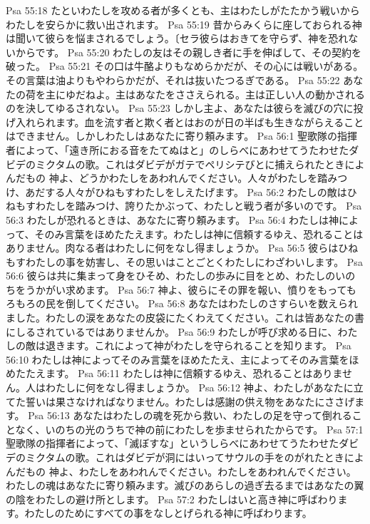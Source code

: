 Psa 55:18  たといわたしを攻める者が多くとも、主はわたしがたたかう戦いからわたしを安らかに救い出されます。
Psa 55:19  昔からみくらに座しておられる神は聞いて彼らを悩まされるでしょう。〔セラ彼らはおきてを守らず、神を恐れないからです。
Psa 55:20  わたしの友はその親しき者に手を伸ばして、その契約を破った。
Psa 55:21  その口は牛酪よりもなめらかだが、その心には戦いがある。その言葉は油よりもやわらかだが、それは抜いたつるぎである。
Psa 55:22  あなたの荷を主にゆだねよ。主はあなたをささえられる。主は正しい人の動かされるのを決してゆるされない。
Psa 55:23  しかし主よ、あなたは彼らを滅びの穴に投げ入れられます。血を流す者と欺く者とはおのが日の半ばも生きながらえることはできません。しかしわたしはあなたに寄り頼みます。
Psa 56:1  聖歌隊の指揮者によって、「遠き所におる音をたてぬはと」のしらべにあわせてうたわせたダビデのミクタムの歌。これはダビデがガテでペリシテびとに捕えられたときによんだもの 神よ、どうかわたしをあわれんでください。人々がわたしを踏みつけ、あだする人々がひねもすわたしをしえたげます。
Psa 56:2  わたしの敵はひねもすわたしを踏みつけ、誇りたかぶって、わたしと戦う者が多いのです。
Psa 56:3  わたしが恐れるときは、あなたに寄り頼みます。
Psa 56:4  わたしは神によって、そのみ言葉をほめたたえます。わたしは神に信頼するゆえ、恐れることはありません。肉なる者はわたしに何をなし得ましょうか。
Psa 56:5  彼らはひねもすわたしの事を妨害し、その思いはことごとくわたしにわざわいします。
Psa 56:6  彼らは共に集まって身をひそめ、わたしの歩みに目をとめ、わたしのいのちをうかがい求めます。
Psa 56:7  神よ、彼らにその罪を報い、憤りをもってもろもろの民を倒してください。
Psa 56:8  あなたはわたしのさすらいを数えられました。わたしの涙をあなたの皮袋にたくわえてください。これは皆あなたの書にしるされているではありませんか。
Psa 56:9  わたしが呼び求める日に、わたしの敵は退きます。これによって神がわたしを守られることを知ります。
Psa 56:10  わたしは神によってそのみ言葉をほめたたえ、主によってそのみ言葉をほめたたえます。
Psa 56:11  わたしは神に信頼するゆえ、恐れることはありません。人はわたしに何をなし得ましょうか。
Psa 56:12  神よ、わたしがあなたに立てた誓いは果さなければなりません。わたしは感謝の供え物をあなたにささげます。
Psa 56:13  あなたはわたしの魂を死から救い、わたしの足を守って倒れることなく、いのちの光のうちで神の前にわたしを歩ませられたからです。
Psa 57:1  聖歌隊の指揮者によって、「滅ぼすな」というしらべにあわせてうたわせたダビデのミクタムの歌。これはダビデが洞にはいってサウルの手をのがれたときによんだもの 神よ、わたしをあわれんでください。わたしをあわれんでください。わたしの魂はあなたに寄り頼みます。滅びのあらしの過ぎ去るまではあなたの翼の陰をわたしの避け所とします。
Psa 57:2  わたしはいと高き神に呼ばわります。わたしのためにすべての事をなしとげられる神に呼ばわります。
